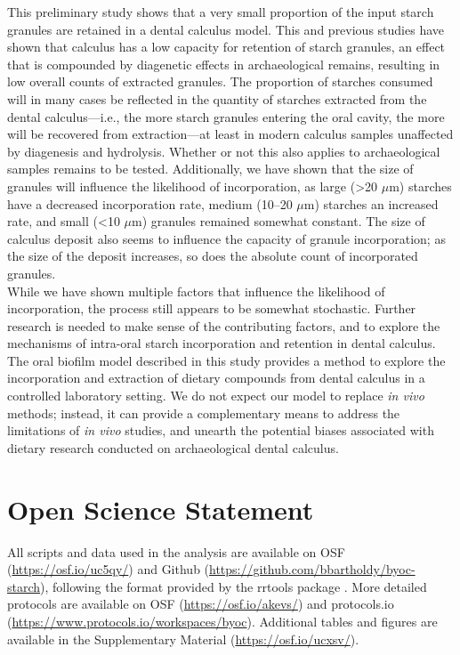 \documentclass[utf8]{../templates/frontiersSCNS}
\begin{document}
This preliminary study shows that a very small proportion of the input starch
granules are retained in a dental calculus model. This and previous studies
have shown that calculus has a low capacity for retention of starch granules,
an effect that is compounded by diagenetic effects in archaeological remains,
resulting in low overall counts of extracted granules.
The proportion of starches consumed will in many cases be reflected
in the quantity
of starches extracted from the dental calculus---i.e., the more starch granules
entering the oral cavity, the more will be recovered from extraction---at
least in modern calculus samples unaffected by diagenesis and hydrolysis.
Whether or not this also applies to archaeological samples remains to be tested.
Additionally, we have
shown that the size of granules will influence the likelihood of incorporation,
as large (\textgreater20 \(\mu\)m) starches have a decreased incorporation rate, medium
(10--20 \(\mu\)m)
starches an increased rate, and small (\textless10 \(\mu\)m) granules remained somewhat
constant. The size of calculus deposit also seems to influence the capacity of
granule incorporation; as the size of the deposit increases, so does the
absolute count of incorporated granules.\\
While we have shown multiple factors that influence the likelihood
of incorporation, the process still appears to be somewhat stochastic. Further
research is needed to make sense of the contributing factors, and to explore the
mechanisms of intra-oral starch incorporation and retention in dental calculus.
The oral biofilm model described in this study provides a method
to explore the incorporation and extraction of dietary compounds from dental calculus
in a controlled laboratory setting. We do not expect our model to replace \emph{in vivo}
methods; instead, it can provide a complementary means to address the limitations
of \emph{in vivo} studies, and unearth the potential biases associated
with dietary research conducted on archaeological dental calculus.

\section*{Open Science Statement}\label{open-science-statement}

All scripts and data used in the analysis are available on OSF
(\url{https://osf.io/uc5qy/}) and Github (\url{https://github.com/bbartholdy/byoc-starch}),
following the format provided by the rrtools package \citep{Rrrtools}.
More detailed protocols are available on OSF (\url{https://osf.io/akevs/})
and protocols.io (\url{https://www.protocols.io/workspaces/byoc}).
Additional tables and figures are available in the Supplementary Material
(\url{https://osf.io/ucxsv/}).
\end{document}
